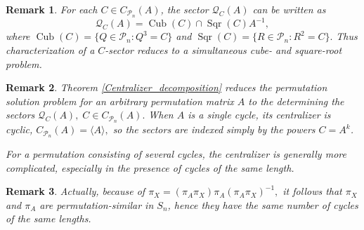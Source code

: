 \documentclass{article}
\newtheorem{remark}{Remark}[section]
\theoremstyle{definition}\newtheorem{example}{Example}[section]
\def\P{{\mathcal{P}}}
\begin{document}
	\begin{remark}
		For each $C\in C_{\P_n}(A)$, the sector $\mathcal Q_C(A)$ can be written as
		$$
		\mathcal Q_C(A)=\operatorname{Cub}(C)\cap \operatorname{Sqr}(C)A^{-1},
		$$
		where $\operatorname{Cub}(C)=\{Q\in \P_n:Q^3=C\}$ and
		$\operatorname{Sqr}(C)=\{R\in \P_n:R^2=C\}.$
		Thus characterization of a $C$-sector reduces to a simultaneous cube- and square-root problem.
	\end{remark}
	
	\begin{remark}
		Theorem \ref{Centralizer_decomposition} reduces the permutation solution problem for an arbitrary
		permutation matrix $A$ to the determining the sectors
		$\mathcal Q_C(A),\; C\in C_{\P_n}(A).$
		When $A$ is a single cycle, its centralizer is cyclic,
		$C_{\P_n}(A)=\langle A\rangle,$
		so the sectors are indexed simply by the powers $C=A^k$.
		
		For a permutation consisting of several cycles, the centralizer is
		generally more complicated, especially in the presence of cycles of
		the same length.
	\end{remark}
	
	\begin{remark}
		Actually, because of $\pi_X=(\pi_A \pi_X)\pi_A (\pi_A \pi_X)^{-1},$ it follows that $\pi_X$ and $\pi_A$ are permutation-similar in $S_n$, hence they have the same number of cycles of the same lengths.
	\end{remark}
	
\end{document}
